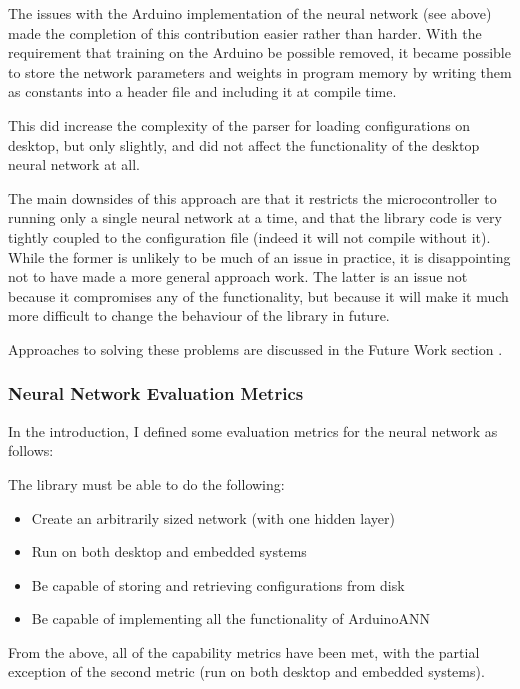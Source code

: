 \documentclass[a4paper]{article}
\begin{document}
The issues with the Arduino implementation of the neural network (see above) made the completion of this contribution easier rather than harder. With the requirement that training on the Arduino be possible removed, it became possible to store the network parameters and weights in program memory by writing them as constants into a header file and including it at compile time. 

This did increase the complexity of the parser for loading configurations on desktop, but only slightly, and did not affect the functionality of the desktop neural network at all.

The main downsides of this approach are that it restricts the microcontroller to running only a single neural network at a time, and that the library code is very tightly coupled to the configuration file (indeed it will not compile without it). While the former is unlikely to be much of an issue in practice, it is disappointing not to have made a more general approach work.
The latter is an issue not because it compromises any of the functionality, but because it will make it much more difficult to change the behaviour of the library in future. 

Approaches to solving these problems are discussed in the Future Work section .

\subsubsection{Neural Network Evaluation Metrics}

In the introduction, I defined some evaluation metrics for the neural network as follows:

The library must be able to do the following:

\begin{itemize}
\item Create an arbitrarily sized network (with one hidden layer)
\item Run on both desktop and embedded systems
\item Be capable of storing and retrieving configurations from disk
\item Be capable of implementing all the functionality of ArduinoANN
\end{itemize}

From the above, all of the capability metrics have been met, with the partial exception of the second metric (run on both desktop and embedded systems).
\end{document}

